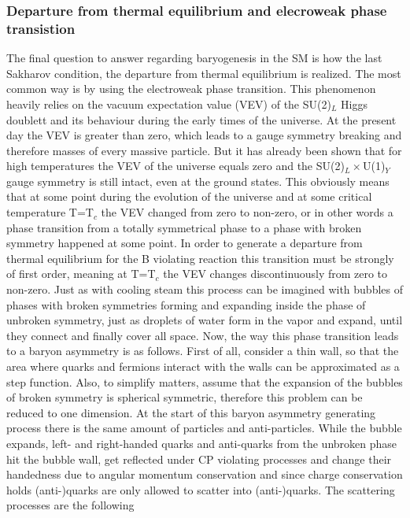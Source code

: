 \subsubsection{Departure from thermal equilibrium and elecroweak phase transistion} The final question to answer regarding baryogenesis in the SM is how the last Sakharov condition, the departure from thermal equilibrium is realized. The most common way is by using the electroweak phase transition. \newline
This phenomenon heavily relies on the vacuum expectation value (VEV) of the SU(2)$_L$ Higgs doublett and its behaviour during the early times of the universe. At the present day the VEV is greater than zero, which leads to a gauge symmetry breaking and therefore masses of every massive particle. But it has already been shown \cite[Ref. 32]{Bernreuther:2002uj} that for high temperatures the VEV of the universe equals zero and the SU(2)$_L\times$U(1)$_Y$ gauge symmetry is still intact, even at the ground states. This obviously means that at some point during the evolution of the universe and at some critical temperature T=T$_c$ the VEV changed from zero to non-zero, or in other words a phase transition from a totally symmetrical phase to a phase with broken symmetry happened at some point. In order to generate a departure from thermal equilibrium for the B violating reaction this transition must be strongly of first order, meaning at T=T$_c$ the VEV changes discontinuously from zero to non-zero. \newline
Just as with cooling steam this process can be imagined with bubbles of phases with broken symmetries forming and expanding inside the phase of unbroken symmetry, just as droplets of water form in the vapor and expand, until they connect and finally cover all space. Now, the way this phase transition leads to a baryon asymmetry is as follows. \newline
First of all, consider a thin wall, so that the area where quarks and fermions interact with the walls can be approximated as a step function. Also, to simplify matters, assume that the expansion of the bubbles of broken symmetry is spherical symmetric, therefore this problem can be reduced to one dimension. \newline
{}
At the start of this baryon asymmetry generating process there is the same amount of particles and anti-particles. \newline
While the bubble expands, left- and right-handed quarks and anti-quarks from the unbroken phase hit the bubble wall, get reflected under CP violating processes and change their handedness due to angular momentum conservation and since charge conservation holds (anti-)quarks are only allowed to scatter into (anti-)quarks. The scattering processes are the following
